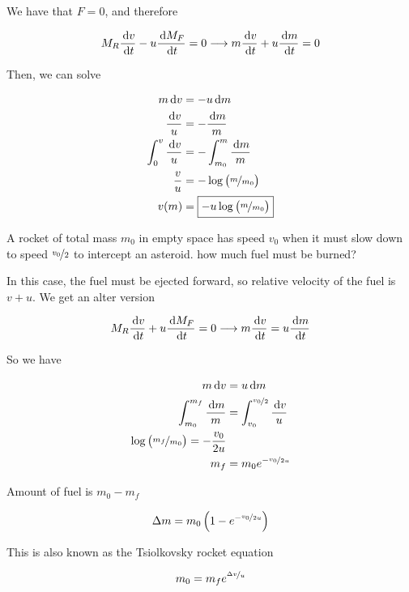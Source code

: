 \begin{sol}
	We have that $F = 0$, and therefore

	\begin{equation}
		M_R \frac{\D v}{\D t} - u \frac{\D M_F}{\D t} = 0 \longrightarrow  m \frac{\D v}{\D t} + u \frac{\D m}{\D t} = 0
	\end{equation}

	Then, we can solve

	\begin{align}
		m \D v &= - u \D m\\
		\frac{\D v}{u} &= -\frac{\D m}{m}\\
		\int_0^v \frac{\D v}{u} &= - \int_{m_0}^{m} \frac{\D m}{m}\\
		\frac{v}{u} &= - \log\left(\nicefrac{m}{m_0}\right)\\
		v(m) &= \boxed{- u \log\left(\nicefrac{m}{m_0}\right)}
	\end{align}
\end{sol}

\begin{example}
	A rocket of total mass $m_0$ in empty space has speed $v_0$ when it must slow down to speed $\nicefrac{v_0}{2}$ to intercept an asteroid. how much fuel must be burned?
\end{example}

\begin{sol}
	In this case, the fuel must be ejected forward, so relative velocity of the fuel is $v + u$. We get an alter version

	\begin{equation}
		M_R \frac{\D v}{\D t} + u \frac{\D M_F}{\D t} = 0 \longrightarrow  m \frac{\D v}{\D t} = u \frac{\D m}{\D t}
	\end{equation}

	So we have

	\begin{align}
		m \D v &= u \D m\\
		\int_{m_0}^{m_f} \frac{\D m}{m} &= \int_{v_0}^{\nicefrac{v_0}{2}} \frac{\D v}{u}\\
		\log\left(\nicefrac{m_f}{m_0}\right) = - \frac{v_0}{2u}\\
		m_f &= m_0 e^{-\nicefrac{v_0}{2u}}
	\end{align}

	Amount of fuel is $m_0 - m_f$

	\begin{equation}
		\Delta m = m_0 \left(1 - e^{-\nicefrac{v_0}{2u}}\right)
	\end{equation}

	This is also known as the Tsiolkovsky rocket equation

	\begin{equation}
		m_0 = m_f e^{\nicefrac{\Delta v}{u}}
	\end{equation}
\end{sol}

